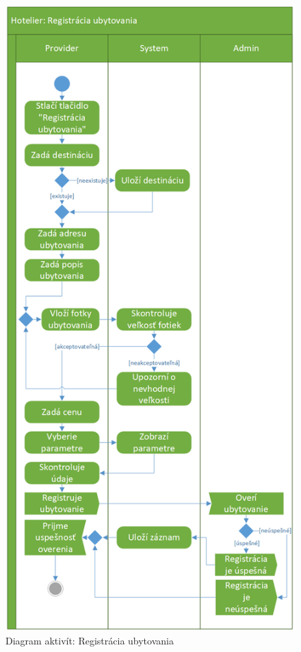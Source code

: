 \begin{figure}[!htbp]
    \centering
    \includegraphics[width=.65\linewidth]{img/act_registerHousing.png}
    \caption{Diagram aktivít: Registrácia ubytovania}
    \label{act_diagram_registerHou}
\end{figure}

\newpage

